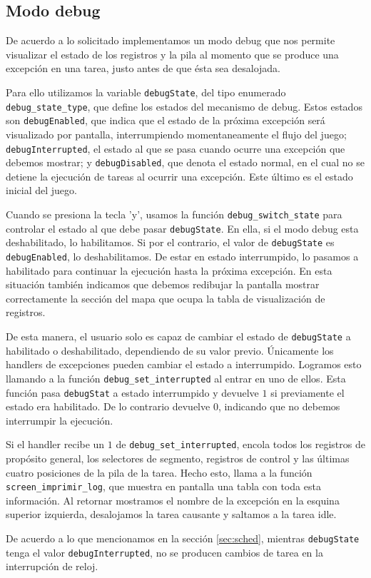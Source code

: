 \subsection{Modo debug}

De acuerdo a lo solicitado implementamos un modo debug que nos permite visualizar el estado de los registros y la pila al momento que se produce una excepción en una tarea, justo antes de que ésta sea desalojada.

Para ello utilizamos la variable \verb|debugState|, del tipo enumerado \verb|debug_state_type|, que define los estados del mecanismo de debug.
Estos estados son \verb|debugEnabled|, que indica que el estado de la próxima excepción será visualizado por pantalla, interrumpiendo momentaneamente el flujo del juego; \verb|debugInterrupted|, el estado al que se pasa cuando ocurre una excepción que debemos mostrar; y \verb|debugDisabled|, que denota el estado normal, en el cual no se detiene la ejecución de tareas al ocurrir una excepción. Este último es el estado inicial del juego.

Cuando se presiona la tecla 'y', usamos la función \verb|debug_switch_state| para controlar el estado al que debe pasar \verb|debugState|. En ella, si el modo debug esta deshabilitado, lo habilitamos. Si por el contrario, el valor de \verb|debugState| es \verb|debugEnabled|, lo deshabilitamos.
De estar en estado interrumpido, lo pasamos a habilitado para continuar la ejecución hasta la próxima excepción. 
En esta situación también indicamos que debemos redibujar la pantalla mostrar correctamente la sección del mapa que ocupa la tabla de visualización de registros.

De esta manera, el usuario solo es capaz de cambiar el estado de \verb|debugState| a habilitado o deshabilitado, dependiendo de su valor previo. Únicamente los handlers de excepciones pueden cambiar el estado a interrumpido. Logramos esto llamando a la función \verb|debug_set_interrupted| al entrar en uno de ellos. 
Esta función pasa \verb|debugStat| a estado interrumpido y devuelve $1$ si previamente el estado era habilitado. De lo contrario devuelve $0$, indicando que no debemos interrumpir la ejecución.

Si el handler recibe un $1$ de \verb|debug_set_interrupted|, encola todos los registros de propósito general, los selectores de segmento, registros de control y las últimas cuatro posiciones de la pila de la tarea. Hecho esto, llama a la función \verb|screen_imprimir_log|, que muestra en pantalla una tabla con toda esta información.
Al retornar mostramos el nombre de la excepción en la esquina superior izquierda, desalojamos la tarea causante y saltamos a la tarea idle.

De acuerdo a lo que mencionamos en la sección \ref{sec:sched}, mientras \verb|debugState| tenga el valor \verb|debugInterrupted|, no se producen cambios de tarea en la interrupción de reloj.

